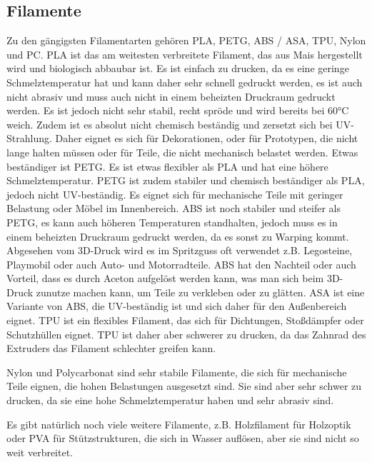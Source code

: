 \documentclass[10pt]{article}
\begin{document}
    \newpage
    \subsection{Filamente}
    Zu den gängigsten Filamentarten gehören PLA, PETG, ABS / ASA, TPU, Nylon und PC.
    PLA ist das am weitesten verbreitete Filament, das aus Mais hergestellt wird und biologisch abbaubar ist.
    Es ist einfach zu drucken, da es eine geringe Schmelztemperatur hat und kann daher sehr schnell gedruckt werden, es ist auch nicht abrasiv und muss auch nicht in einem beheizten Druckraum gedruckt werden.
    Es ist jedoch nicht sehr stabil, recht spröde und wird bereits bei 60°C weich.
    Zudem ist es absolut nicht chemisch beständig und zersetzt sich bei UV-Strahlung.
    Daher eignet es sich für Dekorationen, oder für Prototypen, die nicht lange halten müssen oder für Teile, die nicht mechanisch belastet werden.
    Etwas beständiger ist PETG. Es ist etwas flexibler als PLA und hat eine höhere Schmelztemperatur.
    PETG ist zudem stabiler und chemisch beständiger als PLA, jedoch nicht UV-beständig.
    Es eignet sich für mechanische Teile mit geringer Belastung oder Möbel im Innenbereich.
    ABS ist noch stabiler und steifer als PETG, es kann auch höheren Temperaturen standhalten, jedoch muss es in einem beheizten Druckraum gedruckt werden, da es sonst zu Warping kommt.
    Abgesehen vom 3D-Druck wird es im Spritzguss oft verwendet z.B. Legosteine, Playmobil oder auch Auto- und Motorradteile.
    ABS hat den Nachteil oder auch Vorteil, dass es durch Aceton aufgelöst werden kann, was man sich beim 3D-Druck zunutze machen kann, um Teile zu verkleben oder zu glätten.
    ASA ist eine Variante von ABS, die UV-beständig ist und sich daher für den Außenbereich eignet.
    TPU ist ein flexibles Filament, das sich für Dichtungen, Stoßdämpfer oder Schutzhüllen eignet.
    TPU ist daher aber schwerer zu drucken, da das Zahnrad des Extruders das Filament schlechter greifen kann.

    Nylon und Polycarbonat sind sehr stabile Filamente, die sich für mechanische Teile eignen, die hohen Belastungen ausgesetzt sind.
    Sie sind aber sehr schwer zu drucken, da sie eine hohe Schmelztemperatur haben und sehr abrasiv sind.

    Es gibt natürlich noch viele weitere Filamente, z.B. Holzfilament für Holzoptik oder PVA für Stützstrukturen, die sich in Wasser auflösen, aber sie sind nicht so weit verbreitet. \\
\end{document}
